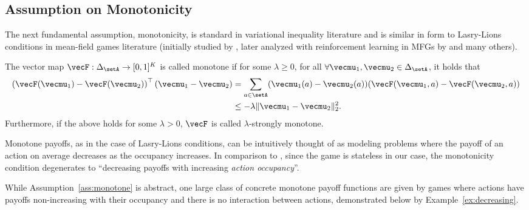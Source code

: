 \subsection{Assumption on Monotonicity}
The next fundamental assumption, monotonicity, is standard in variational inequality literature \citep{facchinei2003finite} and is similar in form to Lasry-Lions conditions in mean-field games literature (initially studied by \cite{lasry2007mean}, later analyzed with reinforcement learning in MFGs by \cite{perrin2020fictitious, perolat2022scaling} and many others).
\begin{assumption}
\label{ass:monotone}
The vector map $\vecF: \Delta_\setA \rightarrow [0,1]^K$ is called monotone if for some $\lambda \geq 0$, for all $\forall \vecmu_1, \vecmu_2 \in \Delta_\setA$, it holds that
\begin{align*}
     \left(\vecF(\vecmu_1) - \vecF(\vecmu_2)\right)^\top (\vecmu_1 - \vecmu_2) &= \sum_{a\in\setA} (\vecmu_1(a) - \vecmu_2(a) ) ( \vecF(\vecmu_1, a) - \vecF(\vecmu_2, a) ) \\
     &\leq - \lambda \| \vecmu_1 - \vecmu_2 \|_2^2.
\end{align*}
Furthermore, if the above holds for some $\lambda > 0$, $\vecF$ is called $\lambda$-strongly monotone.
\end{assumption}
Monotone payoffs, as in the case of Lasry-Lions conditions, can be intuitively thought of as modeling problems where the payoff of an action on average decreases as the occupancy increases.
In comparison to \cite{lasry2007mean, perrin2020fictitious}, since the game is stateless in our case, the monotonicity condition degenerates to ``decreasing payoffs with increasing \emph{action occupancy}''.

While Assumption~\ref{ass:monotone} is abstract, one large class of concrete monotone payoff functions are given by games where actions have payoffs non-increasing with their occupancy and there is no interaction between actions, demonstrated below by Example~\ref{ex:decreasing}.


 

